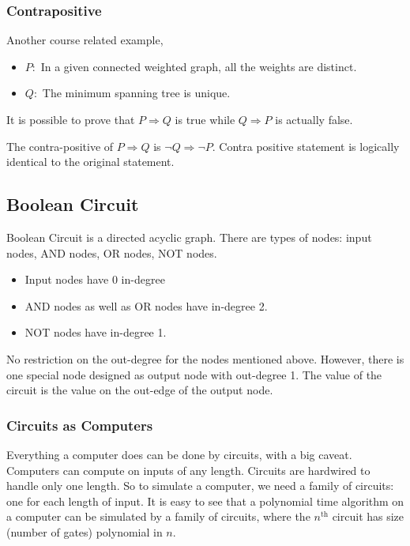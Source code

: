 \subsubsection{Contrapositive}
Another course related example,
\begin{itemize}
	\item $P:$ In a given connected weighted graph, all the weights are distinct.
	\item $Q:$ The minimum spanning tree is unique.
\end{itemize}
It is possible to prove that $P \Rightarrow Q$ is true while $Q \Rightarrow P$ is actually false.

The contra-positive of $P \Rightarrow Q$ is $\neg Q \Rightarrow \neg P$. Contra positive statement is logically identical to the original statement.
\subsection{Boolean Circuit}
Boolean Circuit is a directed acyclic graph. There are types of nodes: input nodes, AND nodes, OR nodes, NOT nodes.
\begin{itemize}
	\item Input nodes have 0 in-degree
	\item AND nodes as well as OR nodes have in-degree 2.
	\item NOT nodes have in-degree 1.
\end{itemize}
No restriction on the out-degree for the nodes mentioned above. However, there is one special node designed as output node with out-degree 1. The value of the circuit is the value on the out-edge of the output node.
\subsubsection{Circuits as Computers}
Everything a computer does can be done by circuits, with a big caveat. Computers can compute on inputs of any length. Circuits are hardwired to handle only one length. So to simulate a computer, we need a family of circuits: one for each length of input. It is easy to see that a polynomial time algorithm on a computer can be simulated by a family of circuits, where the $n^{\text{th}}$ circuit has size (number of gates) polynomial in $n$.
